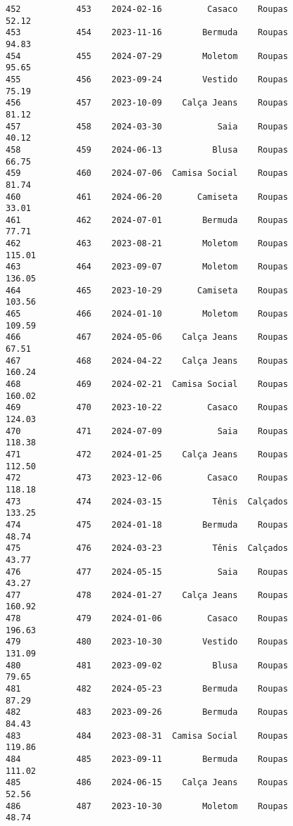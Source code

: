 \documentclass[11pt]{article}
\begin{document}
\begin{Verbatim}[commandchars=\\\{\}]
452           453    2024-02-16         Casaco    Roupas           52.12   
453           454    2023-11-16        Bermuda    Roupas           94.83   
454           455    2024-07-29        Moletom    Roupas           95.65   
455           456    2023-09-24        Vestido    Roupas           75.19   
456           457    2023-10-09    Calça Jeans    Roupas           81.12   
457           458    2024-03-30           Saia    Roupas           40.12   
458           459    2024-06-13          Blusa    Roupas           66.75   
459           460    2024-07-06  Camisa Social    Roupas           81.74   
460           461    2024-06-20       Camiseta    Roupas           33.01   
461           462    2024-07-01        Bermuda    Roupas           77.71   
462           463    2023-08-21        Moletom    Roupas          115.01   
463           464    2023-09-07        Moletom    Roupas          136.05   
464           465    2023-10-29       Camiseta    Roupas          103.56   
465           466    2024-01-10        Moletom    Roupas          109.59   
466           467    2024-05-06    Calça Jeans    Roupas           67.51   
467           468    2024-04-22    Calça Jeans    Roupas          160.24   
468           469    2024-02-21  Camisa Social    Roupas          160.02   
469           470    2023-10-22         Casaco    Roupas          124.03   
470           471    2024-07-09           Saia    Roupas          118.38   
471           472    2024-01-25    Calça Jeans    Roupas          112.50   
472           473    2023-12-06         Casaco    Roupas          118.18   
473           474    2024-03-15          Tênis  Calçados          133.25   
474           475    2024-01-18        Bermuda    Roupas           48.74   
475           476    2024-03-23          Tênis  Calçados           43.77   
476           477    2024-05-15           Saia    Roupas           43.27   
477           478    2024-01-27    Calça Jeans    Roupas          160.92   
478           479    2024-01-06         Casaco    Roupas          196.63   
479           480    2023-10-30        Vestido    Roupas          131.09   
480           481    2023-09-02          Blusa    Roupas           79.65   
481           482    2024-05-23        Bermuda    Roupas           87.29   
482           483    2023-09-26        Bermuda    Roupas           84.43   
483           484    2023-08-31  Camisa Social    Roupas          119.86   
484           485    2023-09-11        Bermuda    Roupas          111.02   
485           486    2024-06-15    Calça Jeans    Roupas           52.56   
486           487    2023-10-30        Moletom    Roupas           48.74   

\end{Verbatim}
\end{document}
